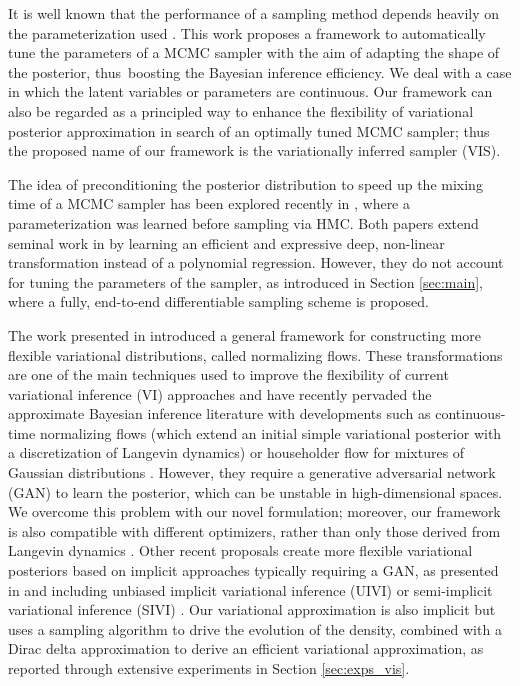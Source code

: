 It is well known that the performance of a sampling method depends
heavily on the parameterization used \cite{papaspiliopoulos2007general}. This work proposes
a framework to automatically tune the parameters of a 
MCMC sampler {with the aim of adapting the shape of the posterior, thus~boosting the Bayesian inference efficiency. 
 We deal with a case in which the latent variables or parameters are continuous. Our framework can also be regarded as a principled way to enhance the flexibility of  variational posterior approximation in search of an optimally tuned MCMC sampler;} thus the proposed name of our framework is {the variationally inferred sampler} (VIS).


{

The idea of preconditioning the posterior distribution to speed up the mixing time of a MCMC sampler has been explored recently in \cite{hoffmanneutra,PhysRevLett.121.260601}, where a parameterization was learned before sampling via HMC. Both papers extend seminal work in \cite{parno2014transport} by learning an efficient and expressive deep, non-linear transformation instead of a polynomial regression. However, they do not account for tuning the parameters of the sampler, as introduced in Section \ref{sec:main}, where a fully, end-to-end differentiable sampling scheme is proposed.

The work presented in \cite{rezende2015variational} introduced a general
framework for constructing more flexible variational distributions, called normalizing flows. These transformations are one of the main techniques used to improve the flexibility of current variational inference (VI) approaches and have recently pervaded the approximate Bayesian inference
literature with developments such as continuous-time normalizing flows \cite{chen2018continuoustime} (which extend an initial simple variational posterior with a discretization of Langevin dynamics) or householder flow for mixtures of Gaussian distributions \cite{LIU201943}. However, they require a generative adversarial network (GAN) \cite{goodfellow2014generative} to learn the posterior,
which can be unstable in high-dimensional spaces. We overcome this problem with our novel formulation; moreover, our framework is also compatible with different optimizers, rather than only those derived from Langevin dynamics \cite{10.5555/3122009.3208015}. Other recent proposals create more flexible variational posteriors based on implicit approaches typically requiring a GAN, as presented in \cite{huszar2017variational} and including unbiased implicit variational inference (UIVI)
\cite{pmlr-v89-titsias19a} or semi-implicit variational inference (SIVI) \cite{yin2018semi}. Our variational approximation is also implicit but uses a sampling algorithm to drive the evolution of the density, combined with a Dirac delta approximation to derive an efficient variational approximation, as reported through extensive experiments in Section \ref{sec:exps_vis}.

}
